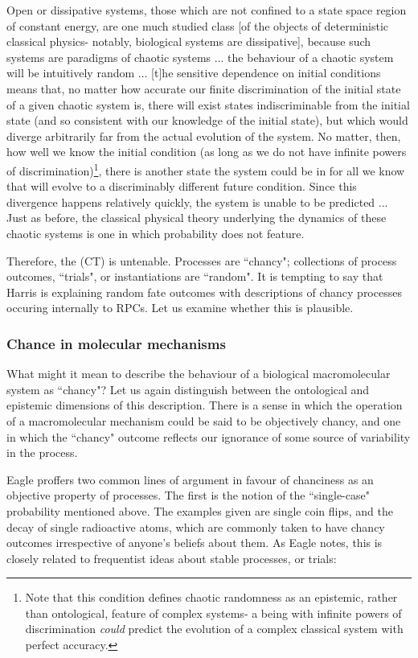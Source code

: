 \documentclass{ut-thesis}
\begin{document}
\begin{NoHyper}
\begin{longquote}
Open or dissipative systems, those which are not confined to a state space region of constant energy, are one much studied class [of the objects of deterministic classical physics- notably, biological systems are dissipative], because such systems are paradigms of chaotic systems ... the behaviour of a chaotic system will be intuitively random ... [t]he sensitive dependence on initial conditions means that, no matter how accurate our finite discrimination of the initial state of a given chaotic system is, there will exist states indiscriminable from the initial state (and so consistent with our knowledge of the initial state), but which would diverge arbitrarily far from the actual evolution of the system. No matter, then, how well we know the initial condition (as long as we do not have infinite powers of discrimination)\footnote{Note that this condition defines chaotic randomness as an epistemic, rather than ontological, feature of complex systems- a being with infinite powers of discrimination \textit{could} predict the evolution of a complex classical system with perfect accuracy.}, there is another state the system could be in for all we know that will evolve to a discriminably different future condition. Since this divergence happens relatively quickly, the system is unable to be predicted ... Just as before, the classical physical theory underlying the dynamics of these chaotic systems is one in which probability does not feature. 
\cite{Eagle2018}
\end{longquote}

Therefore, the (CT) is untenable. Processes are ``chancy"; collections of process outcomes, ``trials", or instantiations are ``random". It is tempting to say that Harris is explaining random fate outcomes with descriptions of chancy processes occuring internally to RPCs. Let us examine whether this is plausible. 

\subsubsection{Chance in molecular mechanisms}
What might it mean to describe the behaviour of a biological macromolecular system as ``chancy"? Let us again distinguish between the ontological and epistemic dimensions of this description. There is a sense in which the operation of a macromolecular mechanism could be said to be objectively chancy, and one in which the ``chancy" outcome reflects our ignorance of some source of variability in the process.

Eagle proffers two common lines of argument in favour of chanciness as an objective property of processes. The first is the notion of the ``single-case" probability mentioned above. The examples given are single coin flips, and the decay of single radioactive atoms, which are commonly taken to have chancy outcomes irrespective of anyone's beliefs about them. As Eagle notes, this is closely related to frequentist ideas about stable processes, or trials:


\end{NoHyper}
\end{document}
